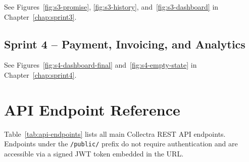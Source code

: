 \documentclass[12pt,a4paper]{report}
\begin{document}
See Figures~\ref{fig:s3-promise}, \ref{fig:s3-history}, and~\ref{fig:s3-dashboard}
in Chapter~\ref{chap:sprint3}.

\section{Sprint 4 -- Payment, Invoicing, and Analytics}

See Figures~\ref{fig:s4-dashboard-final} and~\ref{fig:s4-empty-state}
in Chapter~\ref{chap:sprint4}.

\chapter{API Endpoint Reference}
\label{app:api}

Table~\ref{tab:api-endpoints} lists all main Collectra REST API endpoints.
Endpoints under the \texttt{/public/} prefix do not require authentication and are
accessible via a signed JWT token embedded in the URL.
\end{document}
